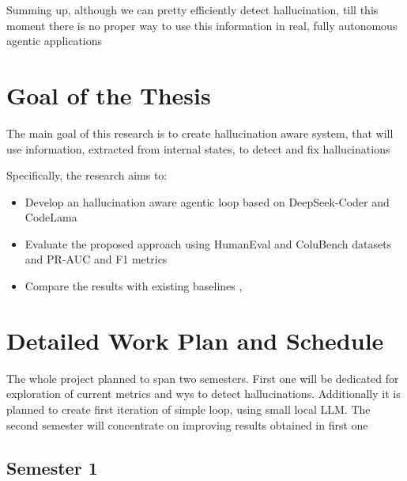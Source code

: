 \documentclass[11pt,a4paper]{article}
\begin{document}
Summing up, although we can pretty efficiently detect
hallucination, till this moment there is no proper way to use
this information in real, fully autonomous agentic applications 


\section{Goal of the Thesis}

The main goal of this research is to create hallucination aware
system, that will use information, extracted from internal states,
to detect and fix hallucinations

Specifically, the research aims to:

\begin{itemize}

    \item Develop an hallucination aware agentic loop based on DeepSeek-Coder and CodeLama

    \item Evaluate the proposed approach using HumanEval and ColuBench datasets and PR-AUC and F1 metrics

    \item Compare the results with existing baselines \cite{andriushchenko2026efficient}, \cite{azaria2023internalstatellmknows}
\end{itemize}


\section{Detailed Work Plan and Schedule}

The whole project planned to span two semesters. First one will be
dedicated for exploration of current metrics and wys to detect hallucinations.
Additionally it is planned to create first iteration of simple loop, using
small local LLM. The second semester will concentrate on improving results
obtained in first one

\subsection*{Semester 1}
\end{document}
